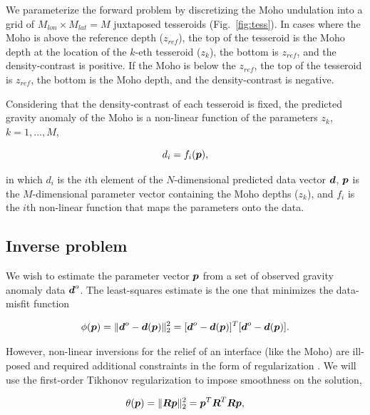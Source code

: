 \documentclass[extra]{gji}
\newcommand{\fig}[1]{Fig.~\ref{fig:#1}}
\newcommand{\mbf}[1]{\hbox{\mathversion{bold}$#1$}}
\begin{document}
We parameterize the forward problem by discretizing the Moho undulation
into a grid of $M_{lon} \times M_{lat} = M$ juxtaposed tesseroids (\fig{tess}).
In cases where the Moho is above the reference depth ($z_{ref}$),
the top of the tesseroid is the Moho depth at the location of the $k$-eth
tesseroid ($z_{k}$),
the bottom is $z_{ref}$, and the density-contrast is positive.
If the Moho is below the $z_{ref}$, the top of the tesseroid is $z_{ref}$,
the bottom is the Moho depth, and the density-contrast is negative.

Considering that the density-contrast of each tesseroid is fixed,
the predicted gravity anomaly of the Moho is a non-linear function of the
parameters $z_k$, $k=1, \ldots, M$,

\begin{equation}
    d_i = f_i(\mbf{p}),
\end{equation}

\noindent in which $d_i$ is the $i$th element of the $N$-dimensional predicted
data vector $\mbf{d}$, $\mbf{p}$ is the $M$-dimensional parameter vector
containing the Moho depths ($z_k$),
and $f_i$ is the $i$th non-linear function that maps the parameters onto the
data.



\subsection{Inverse problem}

We wish to estimate the parameter vector $\mbf{p}$ from a set of observed
gravity anomaly data $\mbf{d}^o$.
The least-squares estimate is the one that minimizes the data-misfit function

\begin{equation}
    \phi(\mbf{p}) = \|\mbf{d}^o - \mbf{d}(\mbf{p})\|_2^2
    = [\mbf{d}^o - \mbf{d}(\mbf{p})]^T[\mbf{d}^o - \mbf{d}(\mbf{p})].
\end{equation}


\noindent However, non-linear inversions for the relief of an interface (like
the Moho) are ill-posed and required additional constraints in the form of
regularization \citep{silva_potential-field_2001}.
We will use the first-order Tikhonov regularization to impose smoothness on the
solution,

\begin{equation}
    \theta(\mbf{p}) = \|\mbf{R}\mbf{p}\|^2_2
    = \mbf{p}^T\mbf{R}^T\mbf{R}\mbf{p},
\end{equation}
\end{document}
